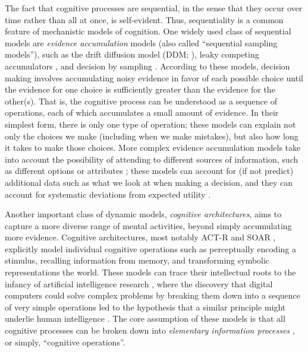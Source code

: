 The fact that cognitive processes are sequential, in the sense that they occur over time rather than all at once, is self-evident. Thus, sequentiality is a common feature of mechanistic models of cognition. One widely used class of sequential models are \emph{evidence accumulation} models (also called ``sequential sampling models''), such as the drift diffusion model (DDM; \citealp{ratcliff1978theory}), leaky competing accumulators \citep{usher2001time}, and decision by sampling \citep{stewart2006decision}. According to these models, decision making involves accumulating noisy evidence in favor of each possible choice until the evidence for one choice is sufficiently greater than the evidence for the other(s). That is, the cognitive process can be understood as a sequence of operations, each of which accumulates a small amount of evidence. In their simplest form, there is only one type of operation; these models can explain not only the choices we make (including when we make mistakes), but also how long it takes to make those choices. More complex evidence accumulation models take into account the possibility of attending to different sources of information, such as different options \citep{krajbich2010visual} or attributes \citep{russo1983strategies}; these models can account for (if not predict) additional data such as what we look at when making a decision, and they can account for systematic deviations from expected utility \citep{busemeyer2019cognitive}.

Another important class of dynamic models, \emph{cognitive architectures}, aims to capture a more diverse range of mental activities, beyond simply accumulating more evidence. Cognitive architectures, most notably ACT-R \citep{anderson1996act} and SOAR \citep{laird1987soar}, explicitly model individual cognitive operations such as perceptually encoding a stimulus, recalling information from memory, and transforming symbolic representations the world. These models can trace their intellectual roots to the infancy of artificial intelligence research \citep{newell1956logic}, where the discovery that digital computers could solve complex problems by breaking them down into a sequence of very simple operations led to the hypothesis that a similar principle might underlie human intelligence \citep{newell1958elements,newell1972human}. The core assumption of these models is that all cognitive processes can be broken down into \emph{elementary information processes} \citep{simon1979information,posner1982information,chase1978elementary}, or simply, ``cognitive operations''.

